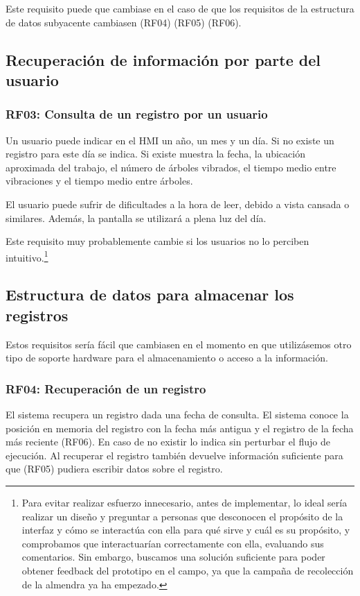 Este requisito puede que cambiase en el caso de que los requisitos
de la estructura de datos subyacente cambiasen (RF04) (RF05) (RF06).

\subsection{Recuperación de información por parte del usuario}

\subsubsection{RF03: Consulta de un registro por un usuario}

Un usuario puede indicar en el HMI un año, un mes y un día.
Si no existe un registro para este día se indica.
Si existe muestra la fecha, la ubicación aproximada del trabajo,
el número de árboles vibrados, el tiempo medio entre vibraciones
y el tiempo medio entre árboles.

El usuario puede sufrir de dificultades a la hora de leer,
debido a vista cansada o similares. Además, la pantalla se
utilizará a plena luz del día.

Este requisito muy probablemente cambie si los usuarios no
lo perciben intuitivo.\footnote{
    Para evitar realizar esfuerzo innecesario, antes de implementar,
    lo ideal sería realizar un diseño y preguntar a personas que desconocen
    el propósito de la interfaz y cómo se interactúa con ella para
    qué sirve y cuál es su propósito, y comprobamos que interactuarían
    correctamente con ella, evaluando sus comentarios. Sin embargo,
    buscamos una solución suficiente para poder obtener feedback 
    del prototipo en el campo, ya que la campaña de recolección de la
    almendra ya ha empezado.
}

\subsection{Estructura de datos para almacenar los registros}

Estos requisitos sería fácil que cambiasen en el momento en que
utilizásemos otro tipo de soporte hardware para el almacenamiento
o acceso a la información.

\subsubsection{RF04: Recuperación de un registro}

El sistema recupera un registro dada una fecha de consulta.
El sistema conoce la posición en memoria del registro con la fecha
más antigua y el registro de la fecha más reciente (RF06).
En caso de no existir lo indica sin perturbar el flujo de ejecución.
Al recuperar el registro también devuelve información suficiente para
que (RF05) pudiera escribir datos sobre el registro.

